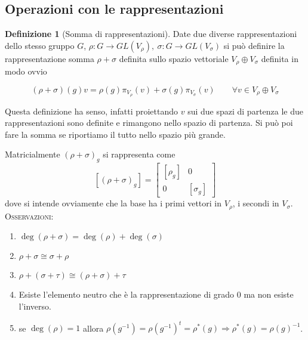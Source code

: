 \documentclass[11pt]{article}
\theoremstyle{plain}
\theoremstyle{definition}
\newtheorem{defn}{Definizione}[section]
\theoremstyle{remark}
\begin{document}
\newpage
\subsection{Operazioni con le rappresentazioni}

\begin{defn}[Somma di rappresentazioni]
  Date due diverse rappresentazioni dello stesso gruppo $G$, $\rho: G \to GL(V_\rho), \ \sigma: G \to GL(V_\sigma)$ si può definire la rappresentazione somma $\rho + \sigma$ definita sullo spazio vettoriale $V_\rho \oplus V_\sigma$ definita in modo ovvio

  \[ (\rho + \sigma)(g) v = \rho(g) \pi_{V_\rho}(v) + \sigma(g) \pi_{V_\sigma}(v) \qquad \forall v \in V_\rho \oplus V_\sigma \]

  Questa definizione ha senso, infatti proiettando $v$ sui due spazi di partenza le due rappresentazioni sono definite e rimangono nello spazio di partenza. Si può poi fare la somma se riportiamo il tutto nello spazio più grande.
\label{defn:somma di rappresentazioni}
\end{defn}
Matricialmente $(\rho+\sigma)_g$ si rappresenta come
\[ [(\rho+\sigma)_g]= \begin{bmatrix}
[\rho_g] & 0\\
0 & [\sigma_g]
\end{bmatrix} \]
dove si intende ovviamente che la base ha i primi vettori in $V_{\rho}$, i secondi in $V_{\sigma}$.\\
\textsc{Osservazioni:}

\begin{enumerate}
\item $\deg(\rho+\sigma)=\deg(\rho)+\deg(\sigma)$
\item $\rho + \sigma \cong \sigma + \rho$
\item $\rho + (\sigma + \tau) \cong (\rho + \sigma ) + \tau$
\item Esiste l'elemento neutro che è la rappresentazione di grado 0 ma non esiste l'inverso.
\item se $\deg(\rho)=1$ allora $\rho(g^{-1})=\rho(g^{-1})^t=\rho^*(g)\Rightarrow \rho^*(g)=\rho(g)^{-1}$.

\end{enumerate}
\end{document}
